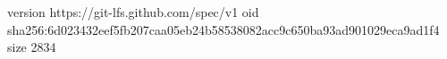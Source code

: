version https://git-lfs.github.com/spec/v1
oid sha256:6d023432eef5fb207caa05eb24b58538082acc9c650ba93ad901029eca9ad1f4
size 2834
